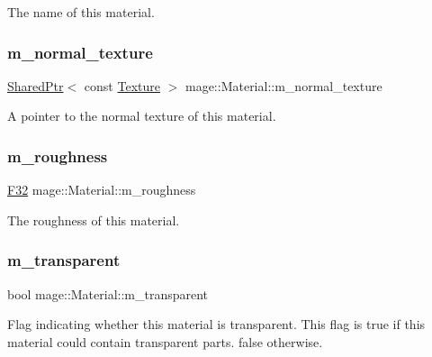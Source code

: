 The name of this material. \hypertarget{structmage_1_1_material_adc2d9d68524a55262bd0f4832880b10b}{}\label{structmage_1_1_material_adc2d9d68524a55262bd0f4832880b10b} 
\subsubsection{\texorpdfstring{m\+\_\+normal\+\_\+texture}{m\_normal\_texture}}
{\footnotesize\ttfamily \hyperlink{namespacemage_a1e01ae66713838a7a67d30e44c67703e}{Shared\+Ptr}$<$ const \hyperlink{classmage_1_1_texture}{Texture} $>$ mage\+::\+Material\+::m\+\_\+normal\+\_\+texture\hspace{0.3cm}{\ttfamily [private]}}

A pointer to the normal texture of this material. \hypertarget{structmage_1_1_material_a2a8a871ee6c18b68c33ce9cdfd23f15f}{}\label{structmage_1_1_material_a2a8a871ee6c18b68c33ce9cdfd23f15f} 
\subsubsection{\texorpdfstring{m\+\_\+roughness}{m\_roughness}}
{\footnotesize\ttfamily \hyperlink{namespacemage_aa97e833b45f06d60a0a9c4fc22ae02c0}{F32} mage\+::\+Material\+::m\+\_\+roughness\hspace{0.3cm}{\ttfamily [private]}}

The roughness of this material. \hypertarget{structmage_1_1_material_abaaf4666e33f4a7952ef9d0801e3f199}{}\label{structmage_1_1_material_abaaf4666e33f4a7952ef9d0801e3f199} 
\subsubsection{\texorpdfstring{m\+\_\+transparent}{m\_transparent}}
{\footnotesize\ttfamily bool mage\+::\+Material\+::m\+\_\+transparent\hspace{0.3cm}{\ttfamily [private]}}

Flag indicating whether this material is transparent. This flag is {\ttfamily true} if this material could contain transparent parts. {\ttfamily false} otherwise. 